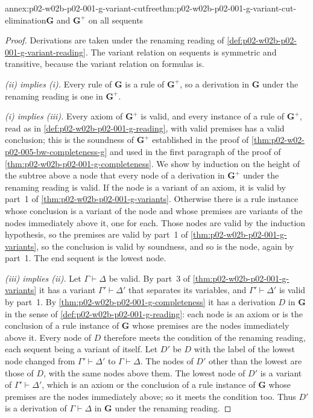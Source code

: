 \begin{annexitem}{annex:p02-w02b-p02-001-g-variant-cutfree}{thm:p02-w02b-p02-001-g-variant-cut-elimination}{\(\mathbf G\) and \(\mathbf G^{+}\) on all sequents}
\begin{proof}
Derivations are taken under the renaming reading of
\cref{def:p02-w02b-p02-001-g-variant-reading}.  The variant relation on
sequents is symmetric and transitive, because the variant relation on
formulas is.

\emph{(ii) implies (i).}  Every rule of \(\mathbf G\) is a rule of
\(\mathbf G^{+}\), so a derivation in \(\mathbf G\) under the renaming
reading is one in \(\mathbf G^{+}\).

\emph{(i) implies (iii).}  Every axiom of \(\mathbf G^{+}\) is valid, and
every instance of a rule of \(\mathbf G^{+}\), read as in
\cref{def:p02-w02b-p02-001-g-reading}, with valid premises has a valid
conclusion; this is the soundness of \(\mathbf G^{+}\) established in the
proof of \cref{thm:p02-w02-p02-005-bw-completeness-g} and used in the first
paragraph of the proof of \cref{thm:p02-w02b-p02-001-g-completeness}.  We
show by induction on the height of the subtree above a node that every
node of a derivation in \(\mathbf G^{+}\) under the renaming reading is
valid.  If the node is a variant of an axiom, it is valid by part~1 of
\cref{thm:p02-w02b-p02-001-g-variants}.  Otherwise there is a rule
instance whose conclusion is a variant of the node and whose premises are
variants of the nodes immediately above it, one for each.  Those nodes are
valid by the induction hypothesis, so the premises are valid by part~1 of
\cref{thm:p02-w02b-p02-001-g-variants}, so the conclusion is valid by
soundness, and so is the node, again by part~1.  The end sequent is the
lowest node.

\emph{(iii) implies (ii).}  Let \(\Gamma\vdash\Delta\) be valid.  By part~3
of \cref{thm:p02-w02b-p02-001-g-variants} it has a variant
\(\Gamma'\vdash\Delta'\) that separates its variables, and
\(\Gamma'\vdash\Delta'\) is valid by part~1.  By
\cref{thm:p02-w02b-p02-001-g-completeness} it has a derivation \(D\) in
\(\mathbf G\) in the sense of \cref{def:p02-w02b-p02-001-g-reading}: each
node is an axiom or is the conclusion of a rule instance of \(\mathbf G\)
whose premises are the nodes immediately above it.  Every node of \(D\)
therefore meets the condition of the renaming reading, each sequent being a
variant of itself.  Let \(D'\) be \(D\) with the label of the lowest node
changed from \(\Gamma'\vdash\Delta'\) to \(\Gamma\vdash\Delta\).  The nodes
of \(D'\) other than the lowest are those of \(D\), with the same nodes
above them.  The lowest node of \(D'\) is a variant of
\(\Gamma'\vdash\Delta'\), which is an axiom or the conclusion of a rule
instance of \(\mathbf G\) whose premises are the nodes immediately above;
so it meets the condition too.  Thus \(D'\) is a derivation of
\(\Gamma\vdash\Delta\) in \(\mathbf G\) under the renaming reading.


\end{proof}
\end{annexitem}
